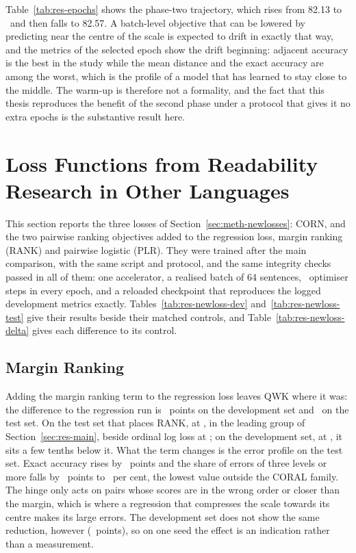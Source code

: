 Table~\ref{tab:res-epochs} shows the phase-two trajectory, which rises from 82.13 to
\devQwkSoftqwk\ and then falls to 82.57. A batch-level objective that can be lowered by
predicting near the centre of the scale is expected to drift in exactly that way, and the
metrics of the selected epoch show the drift beginning: adjacent accuracy is the best in the
study while the mean distance and the exact accuracy are among the worst, which is the profile
of a model that has learned to stay close to the middle. The warm-up is therefore not a
formality, and the fact that this thesis reproduces the benefit of the second phase under a
protocol that gives it no extra epochs is the substantive result here.

\section{Loss Functions from Readability Research in Other Languages}
\label{sec:res-newloss}

This section reports the three losses of Section~\ref{sec:meth-newlosses}: CORN, and the two
pairwise ranking objectives added to the regression loss, margin ranking (RANK) and pairwise
logistic (PLR). They were trained after the main comparison, with the same script and protocol,
and the same integrity checks passed in all of them: one accelerator, a realised batch of
64 sentences, \stepsPerEpoch\ optimiser steps in every epoch, and a reloaded checkpoint that
reproduces the logged development metrics exactly. Tables~\ref{tab:res-newloss-dev}
and~\ref{tab:res-newloss-test} give their results beside their matched controls, and
Table~\ref{tab:res-newloss-delta} gives each difference to its control.







\subsection{Margin Ranking}

Adding the margin ranking term to the regression loss leaves QWK where it was: the difference to
the regression run is \nlDeltaDevQwkRank\ points on the development set and
\nlDeltaTestQwkRank\ on the test set. On the test set that places RANK, at \nlTestQwkRank, in the
leading group of Section~\ref{sec:res-main}, beside ordinal log loss at \testQwkOLL; on the
development set, at \nlDevQwkRank, it sits a few tenths below it. What the term changes is the
error profile on the test set. Exact accuracy rises by \nlDeltaTestAccRank\ points and the share
of errors of three levels or more falls by \nlAbsDeltaTestFarThreeRank\ points to
\nlTestFarThreeRank\ per cent, the lowest value outside the CORAL family. The hinge only acts on
pairs whose scores are in the wrong order or closer than the margin, which is where a regression
that compresses the scale towards its centre makes its large errors. The development set does not
show the same reduction, however (\nlDeltaDevFarThreeRank\ points), so on one seed the effect is
an indication rather than a measurement.

